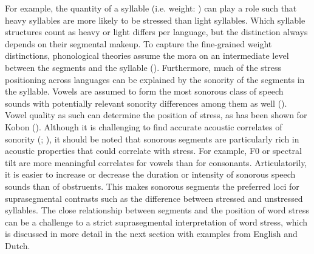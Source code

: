 For example, the quantity of a syllable (i.e. weight: \citealt{hyman_theory_1985}) can play a role such that heavy syllables are more likely to be stressed than light syllables. Which syllable structures count as heavy or light differs per language, but the distinction always depends on their segmental makeup. To capture the fine-grained weight distinctions, phonological theories assume the mora on an intermediate level between the segments and the syllable (\citealt{mccawley_phonological_1968}). Furthermore, much of the stress positioning across languages can be explained by the sonority of the segments in the syllable. Vowels are assumed to form the most sonorous class of speech sounds with potentially relevant sonority differences among them as well (\citealt{parker_quantifying_2002}). Vowel quality as such can determine the position of stress, as has been shown for Kobon (\citealt{kenstowicz_quality-sensitive_1997}). Although it is challenging to find accurate acoustic correlates of sonority (\citealt{parker_quantifying_2002}; \citealt{albert_modeling_2022}), it should be noted that sonorous segments are particularly rich in acoustic properties that could correlate with stress. For example, F0 or spectral tilt are more meaningful correlates for vowels than for consonants. Articulatorily, it is easier to increase or decrease the duration or intensity of sonorous speech sounds than of obstruents. This makes sonorous segments the preferred loci for suprasegmental contrasts such as the difference between stressed and unstressed syllables. The close relationship between segments and the position of word stress can be a challenge to a strict suprasegmental interpretation of word stress, which is discussed in more detail in the next section with examples from English and Dutch.

